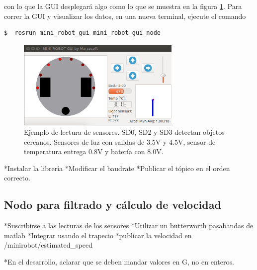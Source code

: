 \documentclass[letterpaper,12pt]{article}
\begin{document}
con lo que la GUI desplegará algo como lo que se muestra en la figura \ref{fig:Example}. Para correr la GUI y visualizar los datos, en una nueva terminal, ejecute el comando

\begin{lstlisting}[language=bash]
$  rosrun mini_robot_gui mini_robot_gui_node
\end{lstlisting}

\begin{figure}
  \centering
  \includegraphics[width=0.7\textwidth]{Figures/SensorExample.png}
  \caption{Ejemplo de lectura de sensores. SD0, SD2 y SD3 detectan objetos cercanos. Sensores de luz con salidas de 3.5V y 4.5V, sensor de temperatura entrega 0.8V y batería con 8.0V.}
  \label{fig:Example}
\end{figure}


*Instalar la librería
*Modificar el baudrate
*Publicar el tópico en el orden correcto. 

\subsection{Nodo para filtrado y cálculo de velocidad}

*Suscribirse a las lecturas de los sensores
*Utilizar un butterworth pasabandas de matlab
*Integrar usando el trapecio
*publicar la velocidad en /minirobot/estimated\_speed


*En el desarrollo, aclarar que se deben mandar valores en G, no en enteros.
\end{document}
